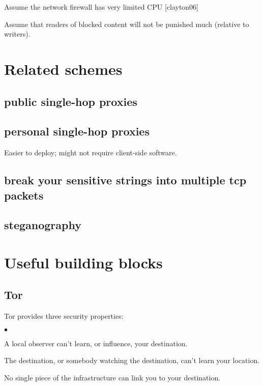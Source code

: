 \documentclass{llncs}
\newenvironment{tightlist}{\begin{list}{$\bullet$}{
  \setlength{\itemsep}{0mm}
    \setlength{\parsep}{0mm}
    }}{\end{list}}
\begin{document}
Assume the network firewall has very limited CPU [clayton06] %

Assume that readers of blocked content will not be punished much
(relative to writers).

\section{Related schemes}

\subsection{public single-hop proxies}

\subsection{personal single-hop proxies}

Easier to deploy; might not require client-side software.

\subsection{break your sensitive strings into multiple tcp packets}

\subsection{steganography}


\section{Useful building blocks}

\subsection{Tor}

Tor provides three security properties:
\begin{tightlist}
\item A local observer can't learn, or influence, your destination.
\item The destination, or somebody watching the destination, can't learn
your location.
\item No single piece of the infrastructure can link you to your
destination.
\end{tightlist}
\end{document}
